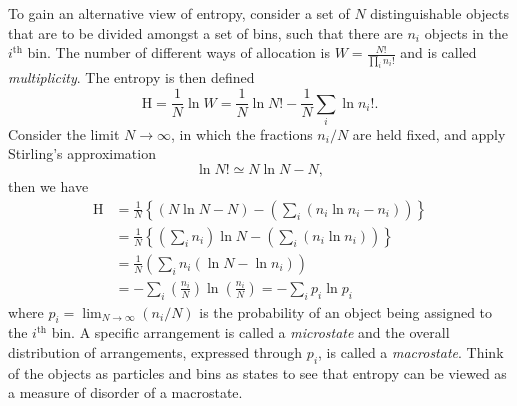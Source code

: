 To gain an alternative view of entropy, consider a set of $N$ distinguishable objects that are to be divided amongst a set of bins, such that there are $n_i$ objects in the $i^{\mathrm{th}}$ bin. The number of different ways of allocation is $W=\displaystyle\frac{N!}{\prod_in_i!}$ and is called \textit{multiplicity}. The entropy is then defined
\[
  \mathrm{H}=\frac{1}{N}\ln W=\frac{1}{N}\ln N!-\frac{1}{N}\sum_i\ln n_i!.
\]
Consider the limit $N\to\infty$, in which the fractions $n_i/N$ are held fixed, and apply Stirling's approximation
\[
  \ln N!\simeq N\ln N-N,
\]
then we have
\begin{align*}
  \mathrm{H} &
  =\frac{1}{N}\left\{\left(N\ln N-N\right)-\left(\sum_i(n_i\ln n_i-n_i)\right)\right\}   \\
             &
  =\frac{1}{N}\left\{\left(\sum_in_i\right)\ln N-\left(\sum_i(n_i\ln n_i)\right)\right\} \\
             &
  =\frac{1}{N}\left(\sum_in_i(\ln N-\ln n_i)\right)                                      \\
             &
  =-\sum_i\left(\frac{n_i}{N}\right)\ln\left(\frac{n_i}{N}\right)=-\sum_ip_i\ln p_i
\end{align*}
where $p_i=\lim_{N\to\infty}(n_i/N)$ is the probability of an object being assigned to the $i^{\mathrm{th}}$ bin. A specific arrangement is called a \textit{microstate} and the overall distribution of arrangements, expressed through $p_i$, is called a \textit{macrostate}. Think of the objects as particles and bins as states to see that entropy can be viewed as a measure of disorder of a macrostate.

